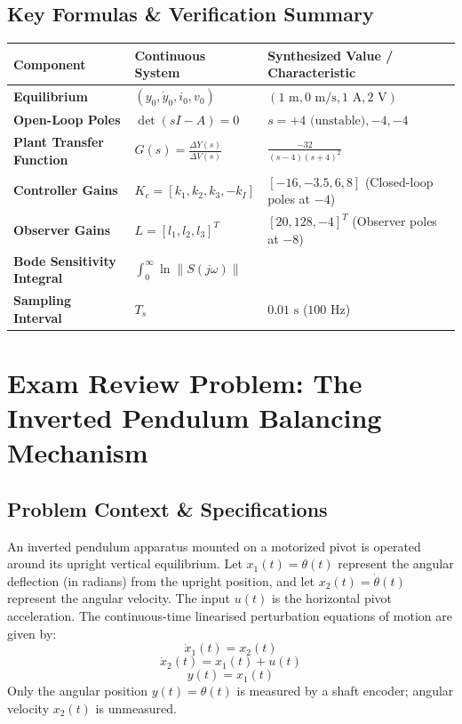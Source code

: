 \documentclass[12pt,onecolumn,twoside ]{article}
\begin{document}
	\subsection{Key Formulas \& Verification Summary}
	\begin{center}\small\begin{tabularx}{\textwidth}{*{3}{Y}}
			\toprule
			\textbf{Component} & \textbf{Continuous System} & \textbf{Synthesized Value / Characteristic} \\
			\midrule
			\textbf{Equilibrium} & $(y_0, \dot{y}_0, i_0, v_0)$ & $(1\text{ m}, 0\text{ m/s}, 1\text{ A}, 2\text{ V})$ \\
			\textbf{Open-Loop Poles} & $\det(sI - A) = 0$ & $s = +4\text{ (unstable)}, -4, -4$ \\
			\textbf{Plant Transfer Function} & $G(s) = \frac{\Delta Y(s)}{\Delta V(s)}$ & $\frac{-32}{(s - 4)(s + 4)^2}$ \\
			\textbf{Controller Gains} & $K_e = [k_1, k_2, k_3, -k_I]$ & $[-16, -3.5, 6, 8]$ (Closed-loop poles at $-4$) \\
			\textbf{Observer Gains} & $L = [l_1, l_2, l_3]^T$ & $[20, 128, -4]^T$ (Observer poles at $-8$) \\
			\textbf{Bode Sensitivity Integral} & $\int_0^\infty \ln \|S(j\omega)\|$ &  \\
			\textbf{Sampling Interval} & $T_s$ & $0.01\text{ s}$ ($100\text{ Hz}$) \\
			\bottomrule
	\end{tabularx}\end{center}
	\newpage
	
	\section{Exam Review Problem: The Inverted Pendulum Balancing Mechanism}
	\subsection{Problem Context \& Specifications}
	An inverted pendulum apparatus mounted on a motorized pivot is operated around its upright vertical equilibrium. Let $x_1(t) = \theta(t)$ represent the angular deflection (in radians) from the upright position, and let $x_2(t) = \dot{\theta}(t)$ represent the angular velocity. The input $u(t)$ is the horizontal pivot acceleration.
	The continuous-time linearised perturbation equations of motion are given by: \[
	\dot{x}_1(t) = x_2(t)
	\] \[
	\dot{x}_2(t) = x_1(t) + u(t)
	\] \[
	y(t) = x_1(t)
	\]
	Only the angular position $y(t) = \theta(t)$ is measured by a shaft encoder; angular velocity $x_2(t)$ is unmeasured.
	
\end{document}
